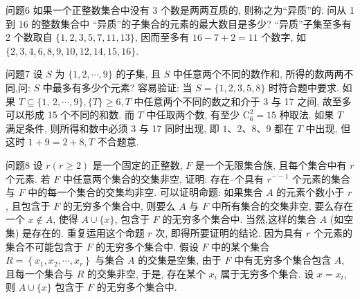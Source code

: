 问题6 如果一个正整数集合中没有 3 个数是两两互质的, 则称之为“异质”的.
问从 1 到 16 的整数集合中 “异质”的子集合的元素的最大数目是多少?
“异质”子集至多有 2 个数取自 $\{1,2,3,5,7,11,13\}$, 因而至多有 $16-7+2=11$ 个数字, 如 $\{2,3,4,6,8,9,10,12,14,15,16\}$.



问题7 设 $S$ 为 $\{1,2, \cdots, 9\}$ 的子集, 且 $S$ 中任意两个不同的数作和, 所得的数两两不同,问: $S$ 中最多有多少个元素?
容易验证: 当 $S=\{1,2,3,5,8\}$ 时符合题中要求.
如果 $T \subseteq\{1$, $2, \cdots, 9\},\{T\} \geqslant 6, T$ 中任意两个不同的数之和介于 3 与 17 之间, 故至多可以形成 15 个不同的和数.
而 $T$ 中任取两个数, 有至少 $\mathrm{C}_6^2=15$ 种取法.
如果 $T$ 满足条件, 则所得和数中必须 3 与 17 同时出现, 即 $1 、 2 、 8 、 9$ 都在 $T$ 中出现, 但这时 $1+9=2+8, T$ 不合题意.



问题8 设 $r(r \geqslant 2)$ 是一个固定的正整数, $F$ 是一个无限集合族, 且每个集合中有 $r$ 个元素.
若 $F$ 中任意两个集合的交集非空, 证明: 存在--个具有 $r^{--1}$ 个元素的集合与 $F$ 中的每一个集合的交集均非空.
可以证明命题: 如果集合 $A$ 的元素个数小于 $r$, 且包含于 $F$ 的无穷多个集合中, 则要么 $A$ 与 $F$ 中所有集合的交集非空, 要么存在一个 $x \notin A$, 使得 $A \cup\{x\}$, 包含于 $F$ 的无穷多个集合中.
当然,这样的集合 $A$ (如空集) 是存在的.
重复运用这个命题 $r$ 次, 即得所要证明的结论.
因为具有 $r$ 个元素的集合不可能包含于 $F$ 的无穷多个集合中.
假设 $F$ 中的某个集合 $R=\left\{x_1, x_2, \cdots, x_r\right\}$ 与集合 $A$ 的交集是空集, 由于 $F$ 中有无穷多个集合包含 $A$, 且每一个集合与 $R$ 的交集非空, 于是, 存在某个 $x_i$ 属于无穷多个集合.
设 $x=x_i$, 则 $A \cup\{x\}$ 包含于 $F$ 的无穷多个集合中.



